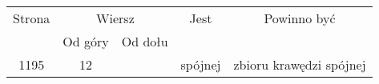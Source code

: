 \documentclass[a4paper,11pt]{article}
\numberwithin{equation}{section}
\begin{document}























\newpage



\begin{center}

  \begin{tabular}{|c|c|c|c|c|}
    \hline
    Strona & \multicolumn{2}{c|}{Wiersz} & Jest
                              & Powinno być \\ \cline{2-3}
    & Od góry & Od dołu & & \\
    \hline
    1195 & 12 & & spójnej & zbioru krawędzi spójnej \\
    \hline
  \end{tabular}

\end{center}
\end{document}
